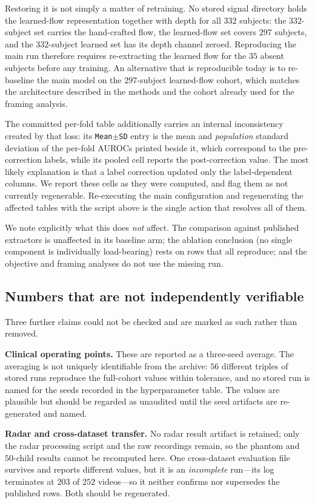 Restoring it is not simply a matter of retraining. No stored signal directory holds the learned-flow
representation together with depth for all $332$ subjects: the $332$-subject set carries the hand-crafted
flow, the learned-flow set covers $297$ subjects, and the $332$-subject learned set has its depth channel
zeroed. Reproducing the main run therefore requires re-extracting the learned flow for the $35$ absent
subjects before any training. An alternative that is reproducible today is to re-baseline the main model
on the $297$-subject learned-flow cohort, which matches the architecture described in the methods and the
cohort already used for the framing analysis.

The committed per-fold table additionally carries an internal inconsistency created by that loss: its
\texttt{Mean$\pm$SD} entry is the mean and \emph{population} standard deviation of the per-fold AUROCs
printed beside it, which correspond to the pre-correction labels, while its pooled cell reports the
post-correction value. The most likely explanation is that a label correction updated only the
label-dependent columns. We report these cells as they were computed, and flag them as not currently
regenerable. Re-executing the main configuration and regenerating the affected tables with the script
above is the single action that resolves all of them.

We note explicitly what this does \emph{not} affect. The comparison against published extractors is
unaffected in its baseline arm; the ablation conclusion (no single component is individually
load-bearing) rests on rows that all reproduce; and the objective and framing analyses do not use the
missing run.

\subsection{Numbers that are not independently verifiable}
Three further claims could not be checked and are marked as such rather than removed.

\textbf{Clinical operating points.} These are reported as a three-seed average. The averaging is not
uniquely identifiable from the archive: $56$ different triples of stored runs reproduce the full-cohort
values within tolerance, and no stored run is named for the seeds recorded in the hyperparameter table.
The values are plausible but should be regarded as unaudited until the seed artifacts are re-generated
and named.

\textbf{Radar and cross-dataset transfer.} No radar result artifact is retained; only the radar
processing script and the raw recordings remain, so the phantom and $50$-child results cannot be
recomputed here. One cross-dataset evaluation file survives and reports different values, but it is an
\emph{incomplete} run---its log terminates at $203$ of $252$ videos---so it neither confirms nor
supersedes the published rows. Both should be regenerated.


